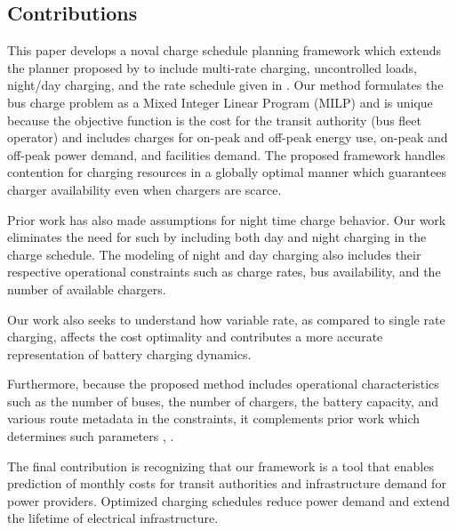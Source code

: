 \subsection{\label{contributions}Contributions}
This paper develops a noval charge schedule planning framework which extends the planner proposed by \cite{whitaker_network_2021} to include multi-rate charging, uncontrolled loads, night/day charging, and the rate schedule given in \cite{noauthor_rocky_nodate}. Our method formulates the bus charge problem as a Mixed Integer Linear Program (MILP) and is unique because the objective function is the cost for the transit authority (bus fleet operator) and includes charges for on-peak and off-peak energy use, on-peak and off-peak power demand, and facilities demand. The proposed framework handles contention for charging resources in a globally optimal manner which guarantees charger availability even when chargers are scarce.
\par Prior work has also made assumptions for night time charge behavior. Our work eliminates the need for such by including both day and night charging in the charge schedule. The modeling of night and day charging also includes their respective operational constraints such as charge rates, bus availability, and the number of available chargers.
\par Our work also seeks to understand how variable rate, as compared to single rate charging, affects the cost optimality and contributes a more accurate representation of battery charging dynamics. 
\par Furthermore, because the proposed method includes operational characteristics such as the number of buses, the number of chargers, the battery capacity, and various route metadata in the constraints, it complements prior work which determines such parameters \cite{taweel_2020_Integrated}, \cite{taweel_2022_Systematic}.
\par The final contribution is recognizing that our framework is a tool that enables prediction of monthly costs for transit authorities and infrastructure demand for power providers.  Optimized charging schedules reduce power demand and extend the lifetime of electrical infrastructure.

